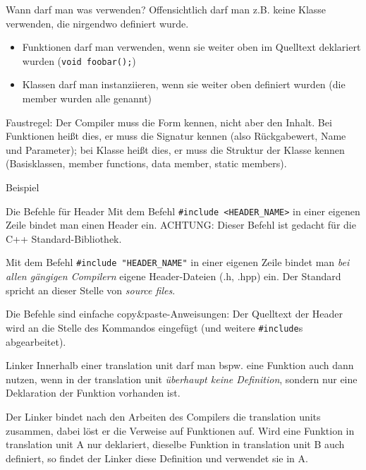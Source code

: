 \begin{frame}[fragile]{Wann darf man was verwenden?}
	Offensichtlich darf man z.B. keine Klasse verwenden, die nirgendwo definiert wurde.
	
	\begin{itemize}
		\item Funktionen darf man verwenden, wenn sie weiter oben im Quelltext deklariert wurden (\verb|void foobar();|)
		\item Klassen darf man instanziieren, wenn sie weiter oben definiert wurden (die member wurden alle genannt)
	\end{itemize}
	
	\pause
	\vspace{1em}
	
	Faustregel: Der Compiler muss die Form kennen, nicht aber den Inhalt. Bei Funktionen heißt dies, er muss die Signatur kennen (also Rückgabewert, Name und Parameter); bei Klasse heißt dies, er muss die Struktur der Klasse kennen (Basisklassen, member functions, data member, static members).
\end{frame}

\begin{frame}{Beispiel}
	\scriptsize
	
\end{frame}

\begin{frame}[fragile]{Die Befehle für Header}
	Mit dem Befehl \verb|#include <HEADER_NAME>| in einer eigenen Zeile bindet man einen Header ein. ACHTUNG: Dieser Befehl ist gedacht für die C++ Standard-Bibliothek.
	
	\vspace{1em}
	
	Mit dem Befehl \verb|#include "HEADER_NAME"| in einer eigenen Zeile bindet man \emph{bei allen gängigen Compilern} eigene Header-Dateien (.h, .hpp) ein. Der Standard spricht an dieser Stelle von \emph{source files}.
	
	\pause
	\vspace{1em}
	
	Die Befehle sind einfache copy\&paste-Anweisungen: Der Quelltext der Header wird an die Stelle des Kommandos eingefügt (und weitere \verb|#include|s abgearbeitet).
\end{frame}

\begin{frame}{Linker}
	Innerhalb einer translation unit darf man bspw. eine Funktion auch dann nutzen, wenn in der translation unit \emph{überhaupt keine Definition}, sondern nur eine Deklaration der Funktion vorhanden ist.
	
	\vspace{1em}
	
	Der Linker bindet nach den Arbeiten des Compilers die translation units zusammen, dabei löst er die Verweise auf Funktionen auf. Wird eine Funktion in translation unit A nur deklariert, dieselbe Funktion in translation unit B auch definiert, so findet der Linker diese Definition und verwendet sie in A.
\end{frame}

